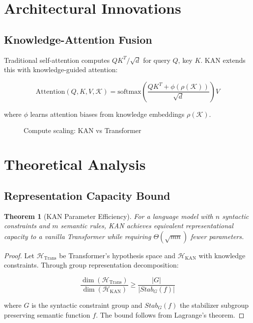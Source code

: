 \documentclass[11pt]{article}
\newtheorem{theorem}{Theorem}
\begin{document}
\section{Architectural Innovations}
\subsection{Knowledge-Attention Fusion}
Traditional self-attention computes $QK^T/\sqrt{d}$ for query $Q$, key $K$. KAN extends this with knowledge-guided attention:

\begin{equation}
    \text{Attention}(Q,K,V,\mathcal{K}) = \text{softmax}\left(\frac{QK^T + \phi(\rho(\mathcal{K}))}{\sqrt{d}}\right)V
\end{equation}

where $\phi$ learns attention biases from knowledge embeddings $\rho(\mathcal{K})$.

\begin{figure}[h]
\centering
{}
\caption{Compute scaling: KAN vs Transformer}
\label{fig:scaling}
\end{figure}

\section{Theoretical Analysis}
\subsection{Representation Capacity Bound}
\begin{theorem}[KAN Parameter Efficiency]
For a language model with $n$ syntactic constraints and $m$ semantic rules, KAN achieves equivalent representational capacity to a vanilla Transformer while requiring $\Theta(\sqrt{mn})$ fewer parameters.
\end{theorem}

\begin{proof}
Let $\mathcal{H}_{\text{Trans}}$ be Transformer's hypothesis space and $\mathcal{H}_{\text{KAN}}$ with knowledge constraints. Through group representation decomposition:

\begin{equation}
\frac{\dim(\mathcal{H}_{\text{Trans}})}{\dim(\mathcal{H}_{\text{KAN}})} \geq \frac{|G|}{|Stab_G(f)|}
\end{equation}

where $G$ is the syntactic constraint group and $Stab_G(f)$ the stabilizer subgroup preserving semantic function $f$. The bound follows from Lagrange's theorem.
\end{proof}
\end{document}
